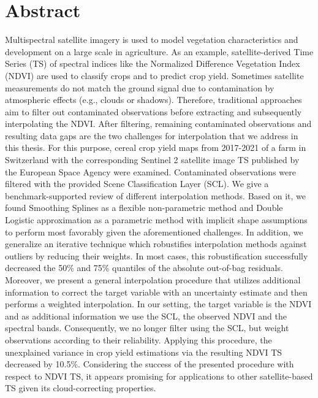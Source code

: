 \chapter*{Abstract}

Multispectral satellite imagery is used to model vegetation characteristics and development on a large scale in agriculture. As an example, satellite-derived Time Series (TS) of spectral indices like the Normalized Difference Vegetation Index (NDVI) are used to classify crops and to predict crop yield. 
Sometimes satellite measurements do not match the ground signal due to contamination by atmospheric effects (e.g., clouds or shadows). Therefore, traditional approaches aim to filter out contaminated observations before extracting and subsequently interpolating the NDVI. After filtering, remaining contaminated observations and resulting data gaps are the two challenges for interpolation that we address in this thesis.
For this purpose, cereal crop yield maps from 2017-2021 of a farm in Switzerland with the corresponding Sentinel 2 satellite image TS published by the European Space Agency were examined. Contaminated observations were filtered with the provided Scene Classification Layer (SCL). 
We give a benchmark-supported review of different interpolation methods. Based on it, we found Smoothing Splines as a flexible non-parametric method and Double Logistic approximation as a parametric method with implicit shape assumptions to perform most favorably given the aforementioned challenges. In addition, we generalize an iterative technique which robustifies interpolation methods against outliers by reducing their weights. In most cases, this robustification successfully decreased the 50\% and 75\% quantiles of the absolute out-of-bag residuals. 
Moreover, we present a general interpolation procedure that utilizes additional information to correct the target variable with an uncertainty estimate and then performs a weighted interpolation. In our setting, the target variable is the NDVI and as additional information we use the SCL, the observed NDVI and the spectral bands. Consequently, we no longer filter using the SCL, but weight observations according to their reliability. %
Applying this procedure, the unexplained variance in crop yield estimations via the resulting NDVI TS decreased by 10.5\%. 
Considering the success of the presented procedure with respect to NDVI TS, it appears promising for applications to other satellite-based TS given its cloud-correcting properties.

